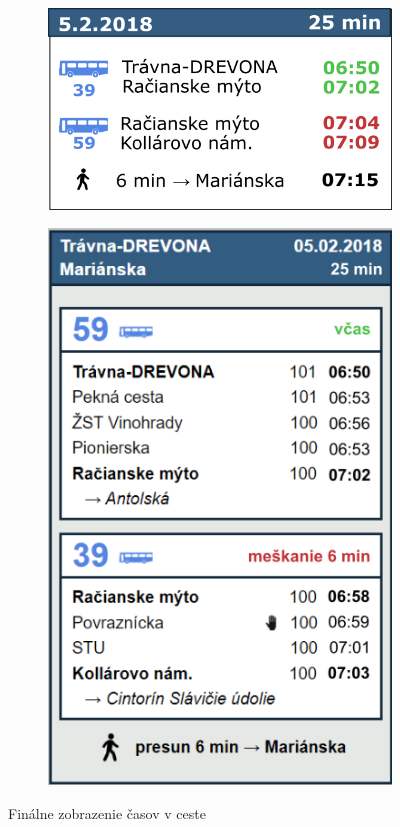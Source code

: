 \begin{figure}[H]
\centering
	\begin{subfigure}[b]{0.48\textwidth}
		\centering
 		\includegraphics[width=0.7\linewidth]{images/time-view3}
	\end{subfigure}
	\begin{subfigure}[b]{0.48\textwidth}
		\centering
		\includegraphics[width=0.7\linewidth]{images/time-view-detail}
	\end{subfigure}
	\caption[Finálne zobrazenie časov v ceste]{Finálne zobrazenie časov v ceste}
	\label{fig:time-view-good}
\end{figure}

